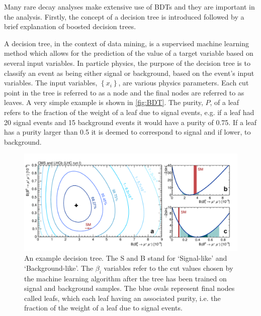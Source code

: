 \label{app:bdt}

Many rare decay analyses make extensive use of BDTs and they are important in the \Lbpi analysis. Firstly, the concept of a decision tree is introduced followed by a brief explanation of boosted decision trees.

A decision tree, in the context of data mining, is a supervised machine learning method which allows for the prediction of the value of a target variable based on several input variables. In particle physics, the purpose of the decision tree is to classify an event as being either signal or background, based on the event's input variables. The input variables, $\left\{x_{i}\right\}$, are various physics parameters. %
Each cut point in the tree is referred to as a node and the final nodes are referred to as leaves. A very simple example is shown in \autoref{fig:BDT}. The purity, $P$, of a leaf refers to the fraction of the weight of a leaf due to signal events, e.g. if a leaf had 20 signal events and 15 background events it would have a purity of 0.75. If a leaf has a purity larger than 0.5 it is deemed to correspond to signal and if lower, to background.
\begin{figure}
  \centering
  \includegraphics[scale = 0.7]{figs/BDT.png}
  \caption{An example decision tree. The S and B stand for `Signal-like' and `Background-like'. The $\beta_{i}$ variables refer to the cut values chosen by the machine learning algorithm after the tree has been trained on signal and background samples. The blue ovals represent final nodes called leafs, which each leaf having an associated purity, i.e. the fraction of the weight of a leaf due to signal events.}
  \label{fig:BDT}
\end{figure}

